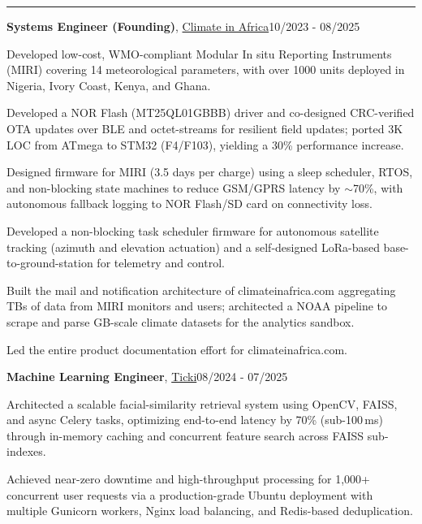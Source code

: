 \documentclass[11pt, a4paper]{article}
\newcommand{\entrytitle}[3]{
    \noindent\textbf{#1}, #2\hfill#3
}
\newcommand{\sectiontitle}[1]{\vspace{1mm}{\color{primaryColor}\noindent\textbf{#1}}\vspace{1.5mm}\hrule\vspace{1mm}}
\begin{document}
\renewcommand{\refname}{}
\renewcommand{\refname}{\vspace{-\baselineskip}}


\nocite{*}


\vspace{-2mm}

\sectiontitle{Professional Experience}

\entrytitle{Systems Engineer (Founding)}{\href{https://climateinafrica.com/}{Climate in Africa}}{10/2023 - 08/2025}
\begin{details}
    \item Developed low-cost, WMO-compliant Modular In situ Reporting Instruments (MIRI) covering 14 meteorological parameters,  with over 1000 units deployed in Nigeria, Ivory Coast, Kenya, and Ghana.
    \item Developed a NOR Flash (MT25QL01GBBB) driver and co-designed CRC-verified OTA updates over BLE and octet-streams for resilient field updates; ported 3K LOC from ATmega to STM32 (F4/F103), yielding a 30\% performance increase.
    \item Designed firmware for MIRI (3.5 days per charge) using a sleep scheduler, RTOS, and non-blocking state machines to reduce GSM/GPRS latency by $\sim$70\%, with autonomous fallback logging to NOR Flash/SD card on connectivity loss.
    \item Developed a non-blocking task scheduler firmware for autonomous satellite tracking (azimuth and elevation actuation) and a self-designed LoRa-based base-to-ground-station for telemetry and control.
    \item Built the mail and notification architecture of climateinafrica.com aggregating TBs of data from MIRI monitors and users; architected a NOAA pipeline to scrape and parse GB-scale climate datasets for the analytics sandbox.
    \item Led the entire product documentation effort for climateinafrica.com.
\end{details}

\entrytitle{Machine Learning Engineer}{\href{https://www.ticki.co/}{Ticki}}{08/2024 - 07/2025}
\begin{details}
    \item Architected a scalable facial-similarity retrieval system using OpenCV, FAISS, and async Celery tasks, optimizing end-to-end latency by 70\% (sub-100\,ms) through in-memory caching and concurrent feature search across FAISS sub-indexes.
    \item Achieved near-zero downtime and high-throughput processing for 1{,}000+ concurrent user requests via a production-grade Ubuntu deployment with multiple Gunicorn workers, Nginx load balancing, and Redis-based deduplication.
\end{details}
\end{document}
